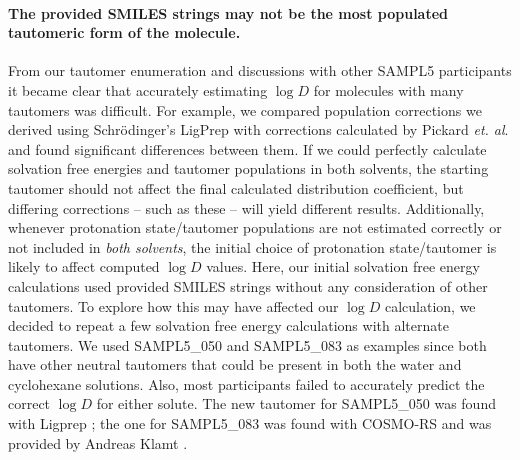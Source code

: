 \paragraph{The provided SMILES strings may not be the most populated tautomeric form of the molecule.}
From our tautomer enumeration and discussions with other SAMPL5 participants  \cite{AndreasKlamt:sampl5pc}
it became clear that accurately estimating $\log D$ for molecules with many tautomers was difficult. 
For example, we compared population corrections we derived using Schr\"{o}dinger's LigPrep  \cite{ligprep} with corrections calculated by Pickard \emph{et. al}.  \cite{FrankPickard:sampl5pc,Pickard:sampl5} and found significant differences between them. 
If we could perfectly calculate solvation free energies and tautomer populations in both solvents, the starting tautomer should not affect the final calculated distribution coefficient, but differing corrections -- such as these -- will yield different results.
Additionally, whenever protonation state/tautomer populations are not estimated correctly or not included in \emph{both solvents}, the initial choice of protonation state/tautomer is likely to affect computed $\log D$ values.
Here, our initial solvation free energy calculations used provided SMILES strings without any consideration of other tautomers.
To explore how this may have affected our $\log D$ calculation, we decided to repeat a few solvation free energy calculations with alternate tautomers. 
We used SAMPL5\_050 and SAMPL5\_083 as examples since both have other neutral tautomers that could be present in both the water and cyclohexane solutions. 
Also, most participants failed to accurately predict the correct $\log D$ for either solute. 
The new tautomer for SAMPL5\_050 was found with Ligprep \cite{ligprep}; the one for SAMPL5\_083 was found with COSMO-RS and was provided by Andreas Klamt \cite{AndreasKlamt:sampl5pc,Klamt:sampl5}. 
